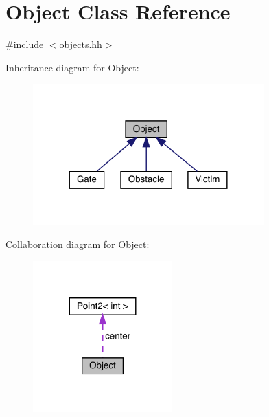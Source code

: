 \hypertarget{class_object}{}\section{Object Class Reference}
\label{class_object}


{\ttfamily \#include $<$objects.\+hh$>$}



Inheritance diagram for Object\+:
\nopagebreak
\begin{figure}[H]
\begin{center}
\leavevmode
\includegraphics[width=252pt]{class_object__inherit__graph}
\end{center}
\end{figure}


Collaboration diagram for Object\+:
\nopagebreak
\begin{figure}[H]
\begin{center}
\leavevmode
\includegraphics[width=152pt]{class_object__coll__graph}
\end{center}
\end{figure}
